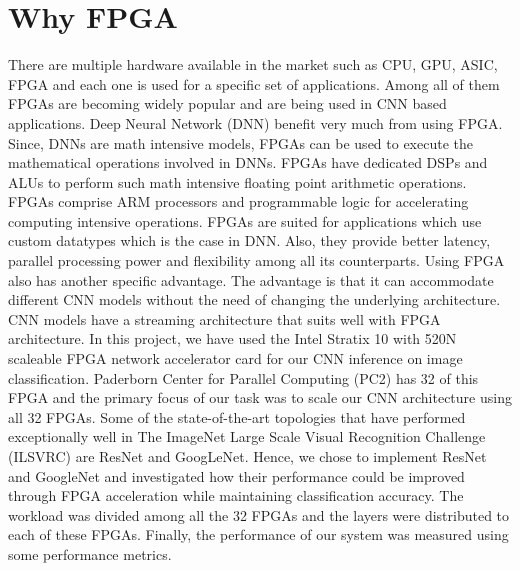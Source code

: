 \section{Why FPGA}
There are multiple hardware available in the market such as CPU, GPU, ASIC, FPGA and each one is used for a specific set of applications. Among all of them FPGAs are becoming widely popular and are being used in CNN based applications. Deep Neural Network (DNN) benefit very much from using FPGA. Since, DNNs are math intensive models, FPGAs can be used to execute the mathematical operations involved in DNNs. FPGAs have dedicated DSPs and ALUs to perform such math intensive floating point arithmetic operations. FPGAs comprise ARM processors and programmable logic for accelerating computing intensive operations. FPGAs are suited for applications which use custom datatypes which is the case in DNN. Also, they provide better latency, parallel processing power and flexibility among all its counterparts. Using FPGA also has another specific advantage. The advantage is that it can accommodate different CNN models without the need of changing the underlying architecture. CNN models have a streaming architecture that suits well with FPGA architecture.
In this project, we have used the Intel Stratix 10 with 520N scaleable FPGA network accelerator card for our CNN inference on image classification. Paderborn Center for Parallel Computing (PC2) has 32 of this FPGA and the primary focus of our task was to scale our CNN architecture using all 32 FPGAs.
Some of the state-of-the-art topologies that have performed exceptionally well in The ImageNet Large Scale Visual Recognition Challenge (ILSVRC) are ResNet and GoogLeNet. Hence, we chose to implement ResNet and GoogleNet and investigated how their performance could be improved through FPGA acceleration while maintaining classification accuracy.
The workload was divided among all the 32 FPGAs and the layers were distributed to each of these FPGAs. Finally, the performance of our system was measured using some performance metrics.